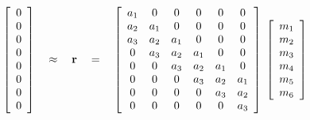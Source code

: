 \begin{equation} 
\left[ 
\begin{array}{c}
  0 \\ 
  0 \\ 
  0 \\ 
  0 \\ 
  0 \\ 
  0 \\ 
  0 \\ 
  0
  \end{array} \right] 
\quad \approx \quad
\bold r
\quad =\quad
\left[ 
\begin{array}{cccccc}
  a_1 & 0   & 0    & 0   & 0   & 0   \\
  a_2 & a_1 & 0    & 0   & 0   & 0   \\
  a_3 & a_2 & a_1  & 0   & 0   & 0   \\
  0   & a_3 & a_2  & a_1 & 0   & 0   \\
  0   & 0   & a_3  & a_2 & a_1 & 0   \\
  0   & 0   & 0    & a_3 & a_2 & a_1 \\
  0   & 0   & 0    & 0   & a_3 & a_2 \\
  0   & 0   & 0    & 0   & 0   & a_3 
  \end{array} \right] 
\; \left[ 
\begin{array}{c}
  m_1 \\ 
  m_2 \\ 
  m_3 \\ 
  m_4 \\ 
  m_5 \\ 
  m_6
  \end{array} \right]
\label{eqn:headache}
\end{equation}

